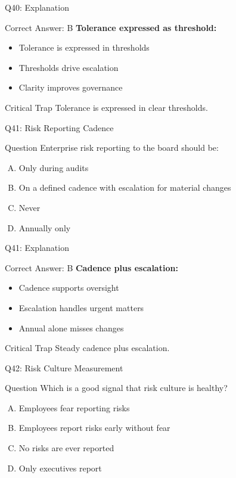 \documentclass{beamer}
\begin{document}
	\begin{frame}{Q40: Explanation}
		\begin{block}{Correct Answer: B}
			\textbf{Tolerance expressed as threshold:}
			\begin{itemize}
				\item Tolerance is expressed in thresholds
				\item Thresholds drive escalation
				\item Clarity improves governance
			\end{itemize}
		\end{block}
		\begin{alertblock}{Critical Trap}
			Tolerance is expressed in clear thresholds.
		\end{alertblock}
	\end{frame}
	
	\begin{frame}{Q41: Risk Reporting Cadence}
		\begin{block}{Question}
			Enterprise risk reporting to the board should be:
		\end{block}
		\begin{enumerate}[(A)]
			\item Only during audits
			\item On a defined cadence with escalation for material changes
			\item Never
			\item Annually only
		\end{enumerate}
	\end{frame}
	
	\begin{frame}{Q41: Explanation}
		\begin{block}{Correct Answer: B}
			\textbf{Cadence plus escalation:}
			\begin{itemize}
				\item Cadence supports oversight
				\item Escalation handles urgent matters
				\item Annual alone misses changes
			\end{itemize}
		\end{block}
		\begin{alertblock}{Critical Trap}
			Steady cadence plus escalation.
		\end{alertblock}
	\end{frame}
	
	\begin{frame}{Q42: Risk Culture Measurement}
		\begin{block}{Question}
			Which is a good signal that risk culture is healthy?
		\end{block}
		\begin{enumerate}[(A)]
			\item Employees fear reporting risks
			\item Employees report risks early without fear
			\item No risks are ever reported
			\item Only executives report
		\end{enumerate}
	\end{frame}
	
\end{document}
